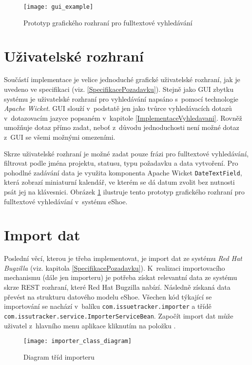 \documentclass[11pt,oneside]{fithesis2}
\begin{document}
\begin{figure}[h]
	\begin{center}
		\texttt{[image: gui\_example]}
	\end{center}
	\caption{Prototyp grafického rozhraní pro fulltextové vyhledávání}	
	\label{GuiExample}
\end{figure}

\section{Uživatelské rozhraní}
Součástí implementace je velice jednoduché grafické uživatelské rozhraní, jak je uvedeno ve specifikaci (viz. \ref{SpecifikacePozadavku}). Stejně jako GUI zbytku systému je uživatelské rozhraní pro vyhledávání napsáno s~pomocí technologie \emph{Apache Wicket}. GUI slouží v~podstatě jen jako tvůrce vyhledávacích dotazů v~dotazovacím jazyce popsaném v~kapitole \ref{ImplementaceVyhledavani}. Rovněž umožňuje dotaz přímo zadat, neboť z~důvodu jednoduchosti není možné  dotaz z~GUI se všemi možnými omezeními. 

Skrze uživatelské rozhraní je možné zadat pouze frázi pro fulltextové vyhledávání, filtrovat podle jména projektu, statusu, typu požadavku a data vytvoření. Pro pohodlné zadávání data je využita komponenta Apache Wicket \texttt{DateTextField}, která zobrazí miniaturní kalendář, ve kterém se dá datum zvolit bez nutnosti psát jej na klávesnici. Obrázek \ref{GuiExample} ilustruje tento prototyp grafického rozhraní pro fulltextové vyhledávání v~systému eShoe.

\section{Import dat}
Poslední věcí, kterou je třeba implementovat, je import dat ze systému \emph{Red Hat Bugzilla} (viz. kapitola \ref{SpecifikacePozadavku}). K~realizaci importovacího mechanismu (dále jen importeru) je potřeba získat relevantní data ze systému skrze REST rozhraní, které Red Hat Bugzilla nabízí. Následně získaná data převést na strukturu datového modelu eShoe. Všechen kód týkající se importování se nachází v~balíku \texttt{com.issuetracker.importer} a třídě \texttt{com.issutracker.service.ImporterServiceBean}. Započít import dat může uživatel z~hlavního menu aplikace kliknutím na položku . 

\begin{figure}[htb]
	\begin{center}
		\texttt{[image: importer\_class\_diagram]}
	\end{center}
	\caption{Diagram tříd importeru}	
	\label{ImporterClassDiagram}
\end{figure}
\end{document}
